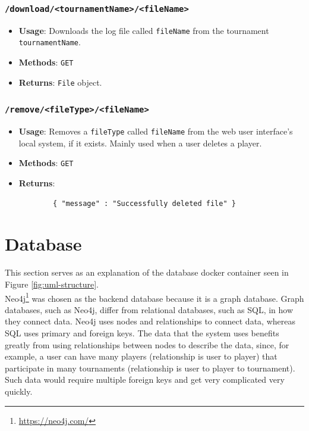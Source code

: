 \documentclass[a4paper, 11pt]{report}
\begin{document}
\subsubsection*{\texttt{/download/<tournamentName>/<fileName>}}
\begin{itemize}
	\item \textbf{Usage}: Downloads the log file called \texttt{fileName} from
	the tournament \texttt{tournamentName}.
	\item \textbf{Methods}: \texttt{GET}
	\item \textbf{Returns}: \texttt{File} object.
\end{itemize}
\subsubsection*{\texttt{/remove/<fileType>/<fileName>}}
\begin{itemize}
	\item \textbf{Usage}: Removes a \texttt{fileType} called \texttt{fileName}
	from the web user interface's local system, if it exists. Mainly used when
	a user deletes a player.
	\item \textbf{Methods}: \texttt{GET}
	\item \textbf{Returns}:
	\begin{verbatim}
		{ "message" : "Successfully deleted file" }
	\end{verbatim}
\end{itemize}

\section{Database}

This section serves as an explanation of the database docker container seen in
Figure \ref{fig:uml-structure}. \\

Neo4j\footnote{\url{https://neo4j.com/}} was chosen as the backend database
because it is a graph database. Graph databases, such as Neo4j, differ from
relational databases, such as SQL, in how they connect data. Neo4j uses nodes
and relationships to connect data, whereas SQL uses primary and foreign keys.
The data that the system uses benefits greatly from using relationships between
nodes to describe the data, since, for example, a user can have many players
(relationship is user to player) that participate in many tournaments (relationship
is user to player to tournament). Such data would require multiple foreign keys
and get very complicated very quickly. \\
\end{document}
